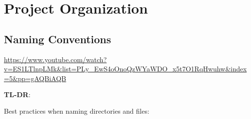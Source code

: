 \documentclass[
  letterpaper,
  DIV=11,
  numbers=noendperiod]{scrreprt}
\begin{document}


\chapter*{Project Organization}\label{project-organization}


\section*{Naming Conventions}\label{naming-conventions}


\url{https://www.youtube.com/watch?v=ES1LTlnpLMk&list=PLy_EwS4oOnoQzWYaWDO_x5t7O1RqHwuhw&index=5&pp=gAQBiAQB}

\textbf{TL-DR}:

Best practices when naming directories and files:
\end{document}
